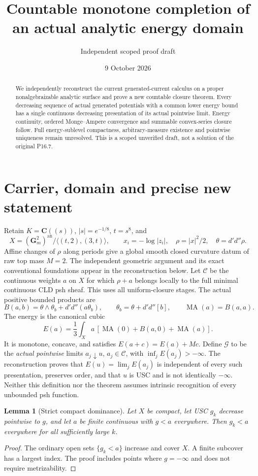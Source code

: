 \documentclass[11pt]{article}
\title{Countable monotone completion of an actual analytic energy domain}
\author{Independent scoped proof draft}
\date{9 October 2026}
\newtheorem{lemma}[theorem]{Lemma}
\newcommand{\C}{\mathcal C}
\newcommand{\G}{\mathcal G}
\newcommand{\MA}{\operatorname{MA}}
\newcommand{\DD}{d'd''}
\begin{document}
\maketitle
\begin{abstract}
We independently reconstruct the current generated-current calculus on a proper
nonalgebraizable analytic surface and prove a new countable closure theorem.
Every decreasing sequence of actual generated potentials with a common lower
energy bound has a single continuous decreasing presentation of its actual
pointwise limit. Energy continuity, ordered Monge--Ampere convergence and
summable convex-series closure follow. Full energy-sublevel compactness,
arbitrary-measure existence and pointwise uniqueness remain unresolved.
This is a scoped unverified draft, not a solution of the original P16.7.
\end{abstract}

\section*{Carrier, domain and precise new statement}
Retain $K=\mathbf C((s))$, $|s|=e^{-1/8}$, $t=s^8$, and
\[
 X=(\mathbf G_m^2)^{\mathrm{an}}/\langle(t,2),(3,t)\rangle,
 \qquad x_i=-\log|z_i|,\quad \rho=|x|^2/2,\quad \theta=\DD\rho.
\]
Affine changes of $\rho$ along periods give a global smooth closed curvature
datum of raw top mass $M=2$. The independent geometric argument and its exact
conventional foundations appear in the reconstruction below. Let $\C$ be the
continuous weights $a$ on $X$ for which $\rho+a$ belongs locally to the full
minimal continuous CLD psh sheaf. This uses all uniform-closure stages.
The actual positive bounded products are
\[
 B(a,b)=\theta\wedge\theta_b+\DD(a\theta_b),\qquad
 \theta_b=\theta+\DD[b],\qquad \MA(a)=B(a,a).
\]
The energy is the canonical cubic
\[
 E(a)=\frac13\int_X a\,[\MA(0)+B(a,0)+\MA(a)].
\]
It is monotone, concave, and satisfies $E(a+c)=E(a)+Mc$.
Define $\G$ to be the \emph{actual pointwise} limits $a_j\downarrow u$,
$a_j\in\C$, with $\inf_j E(a_j)>-\infty$. The reconstruction proves that
$E(u)=\lim_jE(a_j)$ is independent of every such presentation, preserves
order, and that $u$ is USC and is not identically $-\infty$.
Neither this definition nor the theorem assumes intrinsic recognition of
every unbounded psh function.

\begin{lemma}[Strict compact dominance]
Let $X$ be compact, let USC $g_k$ decrease pointwise to $g$, and let $a$ be
finite continuous with $g<a$ everywhere. Then $g_k<a$ everywhere for all
sufficiently large $k$.
\end{lemma}
\begin{proof}
The ordinary open sets $\{g_k<a\}$ increase and cover $X$.
A finite subcover has a largest index. The proof includes points where
$g=-\infty$ and does not require metrizability.
\end{proof}
\end{document}
